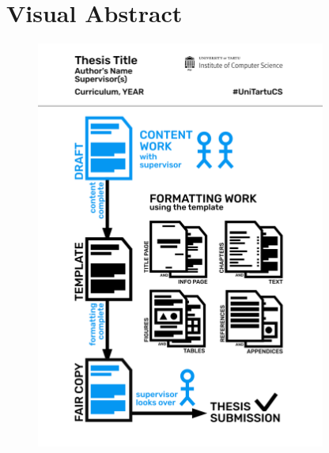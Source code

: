 \newpage
{} %
\section*{Visual Abstract}

\begin{figure}[ht]
    \centering
    \includegraphics[width=0.85\textwidth]{figures/Figure0-VisualAbstract.png}
    \label{fig:visual-abstract}
\end{figure}

\newpage
